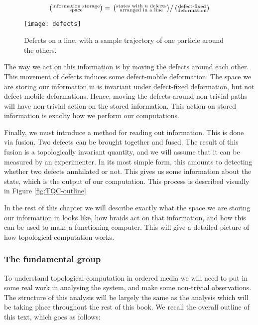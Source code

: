 \begin{equation*}
\left(\substack{
\text{information storage} \\ \text{space}}\right)
=
\left.\left(\substack{
\text{states with $n$ defects} \\ \text{arranged in a line}}\right)\right/
\left(\substack{
\text{defect-fixed} \\ \text{deformation}}\right)
\end{equation*}

\begin{figure}
\begin{center}
\texttt{[image: defects]}
\caption{Defects on a line, with a sample trajectory of one particle around the others.}
\label{fig:defects}
\end{center}
\end{figure}

The way we act on this information is by moving the defects around each other. This movement of defects induces some defect-mobile deformation. The space we are storing our information in is invariant under defect-fixed deformation, but not defect-mobile deformations. Hence, moving the defects around non-trivial paths will have non-trivial action on the stored information. This action on stored information is exaclty how we perform our computations.

Finally, we must introduce a method for reading out information. This is done via fusion. Two defects can be brought together and fused. The result of this fusion is a topologically invariant quantity, and we will assume that it can be measured by an experimenter. In its most simple form, this amounts to detecting whether two defects annhilated or not.  This gives us some information about the state, which is the output of our computation. This process is described visually in Figure \ref{fig:TQC-outline}

In the rest of this chapter we will describe exactly what the space we are storing our information in looks like, how braids act on that information, and how this can be used to make a functioning computer. This will give a detailed picture of how topological computation works.

\subsubsection{The fundamental group}

To understand topological computation in ordered media we will need to put in some real work in analysing the system, and make some non-trivial observations. The structure of this analysis will be largely the same as the analysis which will be taking place throughout the rest of this book. We recall the overall outline of this text, which goes as follows:

